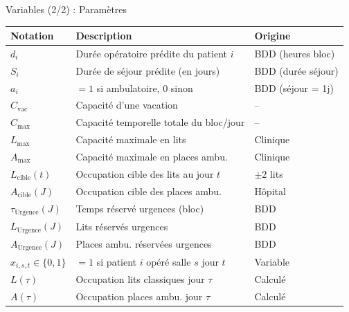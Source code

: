\begin{frame}{Variables (2/2) : Paramètres}
  \begin{table}
    \centering
    \scriptsize
    \setlength{\tabcolsep}{4pt}
    \begin{tabular}{lll}
      \toprule
      \textbf{Notation} & \textbf{Description} & \textbf{Origine} \\
      \midrule
      $d_i$ & Durée opératoire prédite du patient $i$ & BDD (heures bloc) \\
      $S_i$ & Durée de séjour prédite (en jours) & BDD (durée séjour) \\
      $a_i$ & $= 1$ si ambulatoire, $0$ sinon & BDD (séjour = 1j) \\
      $C_{\text{vac}}$ & Capacité d'une vacation & -- \\
      $C_{\max}$ & Capacité temporelle totale du bloc/jour & -- \\
      $L_{\max}$ & Capacité maximale en lits & Clinique \\
      $A_{\max}$ & Capacité maximale en places ambu. & Clinique \\
      $L_{\text{cible}}(t)$ & Occupation cible des lits au jour $t$ & $\pm 2$ lits \\
      $A_{\text{cible}}(J)$ & Occupation cible des places ambu. & Hôpital \\
      $\tau_{\text{Urgence}}(J)$ & Temps réservé urgences (bloc) & BDD \\
      $L_{\text{Urgence}}(J)$ & Lits réservés urgences & BDD \\
      $A_{\text{Urgence}}(J)$ & Places ambu. réservées urgences & BDD \\
      \midrule
      $x_{i,s,t} \in \{0,1\}$ & $= 1$ si patient $i$ opéré salle $s$ jour $t$ & Variable \\
      $L(\tau)$ & Occupation lits classiques jour $\tau$ & Calculé \\
      $A(\tau)$ & Occupation places ambu. jour $\tau$ & Calculé \\
      \bottomrule
    \end{tabular}
  \end{table}
\end{frame}

